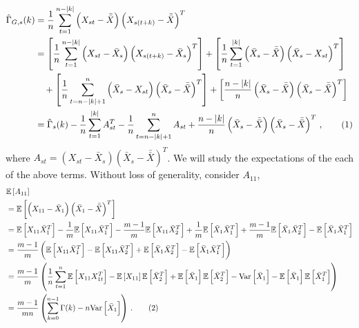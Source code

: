 \documentclass[11pt]{article}
\newcommand{\E}{\mathbb{E}}
\newcommand\numberthis{\addtocounter{equation}{1}\tag{\theequation}}
\theoremstyle{remark}
\begin{document}
\begin{align*}
\hat{\Gamma}_{G,s}(k) & = \dfrac{1}{n}\sum_{t=1}^{n-|k|} \left(X_{st} - \bar{\bar{X}} \right) \left(X_{s(t+k)} - \bar{\bar{X}} \right)^T \\
    &= \left[\dfrac{1}{n} \sum_{t=1}^{n-|k|} \left(X_{st} - \bar{X}_s \right) \left(X_{s(t+k)} - \bar{X}_s \right)^T \right] + \left[\dfrac{1}{n} \sum_{t=1}^{|k|} \left(\bar{X}_s - \bar{\bar{X}} \right)  \left(\bar{X}_s - X_{st} \right)^T\right] \\ 
    & \quad +  \left[\dfrac{1}{n} \sum_{t=n-|k|+1}^{n}  \left( \bar{X}_s - X_{st} \right)  \left(\bar{X}_s - \bar{\bar{X}} \right)^T\right] + \left[\dfrac{n-|k|}{n} \left(\bar{X}_s - \bar{\bar{X}}\right)   \left(\bar{X}_s - \bar{\bar{X}} \right)^T\right]\\
    &= \hat{\Gamma}_s(k) - \dfrac{1}{n} \sum_{t=1}^{|k|}A_{st}^T - \dfrac{1}{n}\sum_{t=n-|k|+1}^{n}A_{st} + \dfrac{n-|k|}{n}  \left(\bar{X}_s - \bar{\bar{X}} \right)  \left(\bar{X}_s - \bar{\bar{X}} \right)^T\,, \numberthis \label{eq:acf_breakdown}
\end{align*}
%
where $A_{st} = (X_{st}-\bar{X}_s)(\bar{X}_s - \bar{\bar{X}})^T$. We will study the expectations of the each of the above terms. Without loss of generality, consider $A_{11}$,
\begin{align*}
    &\E \left[A_{11} \right]\\
     &= \mathbb{E} \left[ \left(X_{11} - \bar{X}_1 \right) \left(\bar{X}_1 - \bar{\bar{X}} \right)^T \right]\\
    &= \mathbb{E} \left[X_{11}\bar{X}_1^T \right] - \dfrac{1}{m}\mathbb{E} \left[X_{11}\bar{X}_1^T \right] - \dfrac{m-1}{m}\mathbb{E} \left[X_{11}\bar{X}_2^T \right] + \dfrac{1}{m}\mathbb{E} \left[\bar{X}_1\bar{X}_1^T \right] + \dfrac{m-1}{m}\mathbb{E} \left[\bar{X}_1\bar{X}_2^T \right] - \mathbb{E} \left[\bar{X}_1\bar{X}_1^T \right]\\
    &= \dfrac{m-1}{m}\left(\mathbb{E} \left[X_{11}\bar{X}_1^T \right] - \mathbb{E} \left[X_{11}\bar{X}_2^T \right] + \mathbb{E} \left[\bar{X}_1\bar{X}_2^T \right] - \mathbb{E} \left[\bar{X}_1\bar{X}_1^T \right]\right)\\
    &= \dfrac{m-1}{m}\left(\dfrac{1}{n}\sum_{t=1}^{n}\mathbb{E} \left[X_{11}X_{1t}^T \right] - \mathbb{E}\left[X_{11}\right] \mathbb{E}\left[\bar{X}_2^T \right] + \mathbb{E} \left[\bar{X}_1\right]\mathbb{E}\left[\bar{X}_2^T\right] - \text{Var}\left[\bar{X}_1 \right] - \mathbb{E}\left[\bar{X}_1 \right]\mathbb{E}\left[\bar{X}_1^T \right]\right)\\
    &= \dfrac{m-1}{mn}\left(\sum_{k=0}^{n-1}\Gamma(k) - n\text{Var}\left[\bar{X}_1 \right]\right)\,. \numberthis \label{eq:acf_2}
\end{align*}
\end{document}
